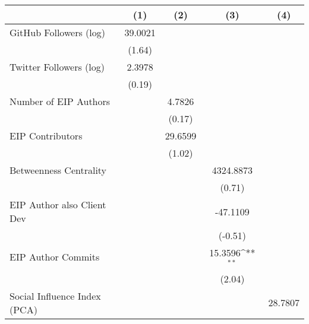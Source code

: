 {
\def\sym#1{\ifmmode^{#1}\else\(^{#1}\)\fi}
\begin{tabular}{l*{4}{c}}
\hline\hline
                                   &\multicolumn{1}{c}{(1)}         &\multicolumn{1}{c}{(2)}         &\multicolumn{1}{c}{(3)}         &\multicolumn{1}{c}{(4)}         \\
\hline
GitHub Followers (log)             &   39.0021         &                   &                   &                   \\
                                   &    (1.64)         &                   &                   &                   \\
[1em]
Twitter Followers (log)            &    2.3978         &                   &                   &                   \\
                                   &    (0.19)         &                   &                   &                   \\
[1em]
Number of EIP Authors              &                   &    4.7826         &                   &                   \\
                                   &                   &    (0.17)         &                   &                   \\
[1em]
EIP Contributors                   &                   &   29.6599         &                   &                   \\
                                   &                   &    (1.02)         &                   &                   \\
[1em]
Betweenness Centrality             &                   &                   & 4324.8873         &                   \\
                                   &                   &                   &    (0.71)         &                   \\
[1em]
EIP Author also Client Dev         &                   &                   &  -47.1109         &                   \\
                                   &                   &                   &   (-0.51)         &                   \\
[1em]
EIP Author Commits                 &                   &                   &   15.3596\sym{**} &                   \\
                                   &                   &                   &    (2.04)         &                   \\
[1em]
Social Influence Index (PCA)       &                   &                   &                   &   28.7807         \\

\end{tabular}}
